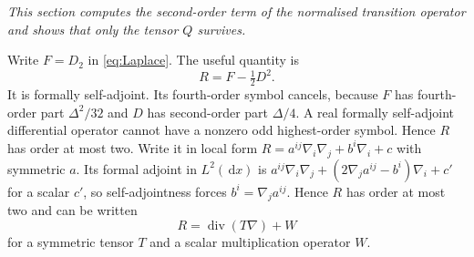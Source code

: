 \documentclass[11pt,a4paper]{article}
\theoremstyle{definition}\newtheorem{definition}[theorem]{Definition}
\theoremstyle{remark}\newtheorem{remark}[theorem]{Remark}
\newcommand{\dd}{\,\mathrm d}
\newcommand{\diver}{\operatorname{div}}
\begin{document}
\noindent\emph{This section computes the second-order term of the normalised transition operator and shows that only the tensor $Q$ survives.}

Write $F=D_2$ in \eqref{eq:Laplace}. The useful quantity is
\[
R=F-\tfrac12D^2.
\]
It is formally self-adjoint. Its fourth-order symbol cancels, because $F$ has fourth-order part $\Delta^2/32$ and $D$ has second-order part $\Delta/4$. A real formally self-adjoint differential operator cannot have a nonzero odd highest-order symbol. Hence $R$ has order at most two. Write it in local form $R=a^{ij}\nabla_i\nabla_j+b^i\nabla_i+c$ with symmetric $a$. Its formal adjoint in $L^2(\dd x)$ is $a^{ij}\nabla_i\nabla_j+(2\nabla_ja^{ij}-b^i)\nabla_i+c'$ for a scalar $c'$, so self-adjointness forces $b^i=\nabla_ja^{ij}$. Hence $R$ has order at most two and can be written
\begin{equation}\label{eq:Rform}
R=\diver(T\nabla)+W
\end{equation}
for a symmetric tensor $T$ and a scalar multiplication operator $W$.
\end{document}
